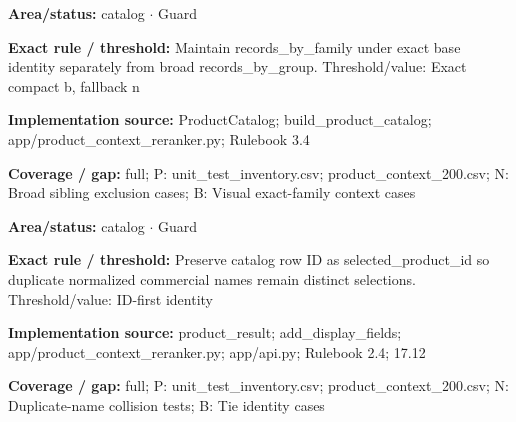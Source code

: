 \begin{tcolorbox}[enhanced,breakable,colback=white,colframe=Muted!45,boxrule=0.45pt,arc=1.5pt,left=6pt,right=6pt,top=5pt,bottom=5pt,title={\texttt{CAT-PRODUCT-EXACT-BASE-03}},title after break={\texttt{CAT-PRODUCT-EXACT-BASE-03}\ (continued)},fonttitle=\headingfont\bfseries\color{Navy},coltitle=Navy]
\textbf{Area/status:} catalog $\boldsymbol{\cdot}$ Guard\par
\smallskip
\textbf{Exact rule / threshold:} Maintain records\_\allowbreak{}by\_\allowbreak{}family under exact base identity separately from broad records\_\allowbreak{}by\_\allowbreak{}group. Threshold/\allowbreak{}value: Exact compact b, fallback n\par
\smallskip
\textbf{Implementation source:} ProductCatalog; build\_\allowbreak{}product\_\allowbreak{}catalog; app/\allowbreak{}product\_\allowbreak{}context\_\allowbreak{}reranker.py; Rulebook 3.4\par
\smallskip
\textbf{Coverage / gap:} full; P: unit\_\allowbreak{}test\_\allowbreak{}inventory.csv; product\_\allowbreak{}context\_\allowbreak{}200.csv; N: Broad sibling exclusion cases; B: Visual exact-family context cases
\end{tcolorbox}
\begin{tcolorbox}[enhanced,breakable,colback=white,colframe=Muted!45,boxrule=0.45pt,arc=1.5pt,left=6pt,right=6pt,top=5pt,bottom=5pt,title={\texttt{CAT-STABLE-PRODUCT-ID-05}},title after break={\texttt{CAT-STABLE-PRODUCT-ID-05}\ (continued)},fonttitle=\headingfont\bfseries\color{Navy},coltitle=Navy]
\textbf{Area/status:} catalog $\boldsymbol{\cdot}$ Guard\par
\smallskip
\textbf{Exact rule / threshold:} Preserve catalog row ID as selected\_\allowbreak{}product\_\allowbreak{}id so duplicate normalized commercial names remain distinct selections. Threshold/\allowbreak{}value: ID-first identity\par
\smallskip
\textbf{Implementation source:} product\_\allowbreak{}result; add\_\allowbreak{}display\_\allowbreak{}fields; app/\allowbreak{}product\_\allowbreak{}context\_\allowbreak{}reranker.py; app/\allowbreak{}api.py; Rulebook 2.4; 17.12\par
\smallskip
\textbf{Coverage / gap:} full; P: unit\_\allowbreak{}test\_\allowbreak{}inventory.csv; product\_\allowbreak{}context\_\allowbreak{}200.csv; N: Duplicate-name collision tests; B: Tie identity cases
\end{tcolorbox}
